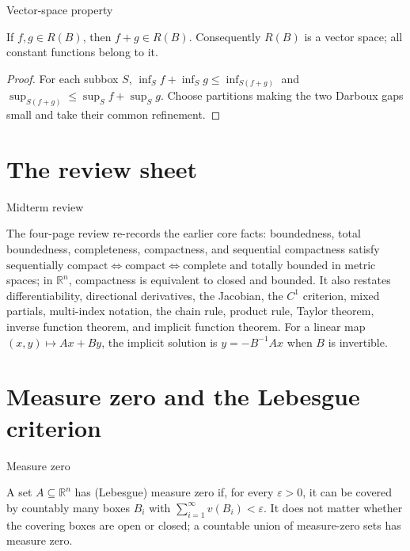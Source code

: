 \begin{lemma}{Vector-space property}

If \(f,g \in R(B)\), then \(f + g \in R(B)\). Consequently \(R(B)\) is a vector space; all constant functions belong to it.

\end{lemma}

\begin{proof}

For each subbox \(S\), \(\inf_{S}f + \inf_{S}g \leq \inf_{S{({f + g})}}\) and \(\sup_{S{({f + g})}} \leq \sup_{S}f + \sup_{S}g\). Choose partitions making the two Darboux gaps small and take their common refinement.

\end{proof}

\section{The review sheet}

\begin{qlremark}{Midterm review}

The four-page review re-records the earlier core facts: boundedness, total boundedness, completeness, compactness, and sequential compactness satisfy \(\text{sequentially compact}\Leftrightarrow\text{compact}\Leftrightarrow\text{complete and totally bounded}\) in metric spaces; in \(\mathbb{R}^{n}\), compactness is equivalent to closed and bounded. It also restates differentiability, directional derivatives, the Jacobian, the \(C^{1}\) criterion, mixed partials, multi-index notation, the chain rule, product rule, Taylor theorem, inverse function theorem, and implicit function theorem. For a linear map \(\left( {x,y} \right)\mapsto Ax + By\), the implicit solution is \(y = - B^{- 1}Ax\) when \(B\) is invertible.

\end{qlremark}

\section{Measure zero and the Lebesgue criterion}

\begin{definition}{Measure zero}

A set \(A \subseteq \mathbb{R}^{n}\) has (Lebesgue) measure zero if, for every \(\varepsilon > 0\), it can be covered by countably many boxes \(B_{i}\) with \(\sum_{i = 1}^{\infty}v\left( B_{i} \right) < \varepsilon\). It does not matter whether the covering boxes are open or closed; a countable union of measure-zero sets has measure zero.

\end{definition}

